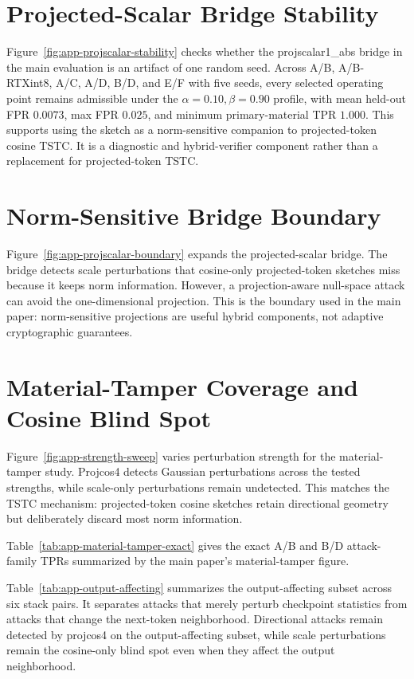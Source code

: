 \documentclass[sigplan,screen,review,anonymous]{acmart}
\begin{document}
\section{Projected-Scalar Bridge Stability}
\label{app:projscalar-stability}

Figure~\ref{fig:app-projscalar-stability} checks whether the
projscalar1\_abs bridge in the main evaluation is an artifact of one random
seed. Across A/B, A/B-RTXint8, A/C, A/D, B/D, and E/F with five seeds, every
selected operating point remains admissible under the
\(\alpha=0.10,\beta=0.90\) profile, with mean held-out FPR \(0.0073\), max FPR
\(0.025\), and minimum primary-material TPR \(1.000\). This supports using the
sketch as a norm-sensitive companion to projected-token cosine TSTC. It is a
diagnostic and hybrid-verifier component rather than a replacement for
projected-token TSTC.


\section{Norm-Sensitive Bridge Boundary}
\label{app:projscalar-boundary}

Figure~\ref{fig:app-projscalar-boundary} expands the projected-scalar bridge.
The bridge detects scale perturbations that cosine-only projected-token
sketches miss because it keeps norm information. However, a projection-aware
null-space attack can avoid the one-dimensional projection. This is the
boundary used in the main paper: norm-sensitive projections are useful hybrid
components, not adaptive cryptographic guarantees.


\section{Material-Tamper Coverage and Cosine Blind Spot}
\label{app:strength-sweep}

Figure~\ref{fig:app-strength-sweep} varies perturbation strength for the
material-tamper study. Projcos4 detects Gaussian perturbations across the
tested strengths, while scale-only perturbations remain undetected. This
matches the TSTC mechanism: projected-token cosine sketches retain directional
geometry but deliberately discard most norm information.

Table~\ref{tab:app-material-tamper-exact} gives the exact A/B and B/D
attack-family TPRs summarized by the main paper's material-tamper figure.


Table~\ref{tab:app-output-affecting} summarizes the output-affecting subset
across six stack pairs. It separates attacks that merely perturb checkpoint
statistics from attacks that change the next-token neighborhood. Directional
attacks remain detected by projcos4 on the output-affecting subset, while
scale perturbations remain the cosine-only blind spot even when they affect
the output neighborhood.
\end{document}

